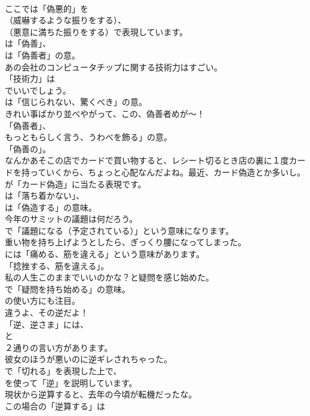 \documentclass[8pt]{extreport}
\begin{document}
\begin{CJK}{UTF8}{min}
\\	ここでは「偽悪的」を 
\\	（威嚇するような振りをする）、
\\	（悪意に満ちた振りをする）で表現しています。
\\	は「偽善」、
\\	は「偽善者」の意。	
\\	あの会社のコンピュータチップに関する技術力はすごい。 
\\	「技術力」は 
\\	でいいでしょう。
\\	は「信じられない、驚くべき」の意。	
\\	きれい事ばかり並べやがって、この、偽善者めが～！ 
\\	「偽善者」、
\\	もっともらしく言う、うわべを飾る」の意。
\\	「偽善の」。	
\\	なんかあそこの店でカードで買い物すると、レシート切るとき店の裏に１度カードを持っていくから、ちょっと心配なんだよね。最近、カード偽造とか多いし。 
\\	が「カード偽造」に当たる表現です。
\\	は「落ち着かない」、
\\	は「偽造する」の意味。	
\\	今年のサミットの議題は何だろう。 
\\	で「議題になる（予定されている）」という意味になります。	
\\	重い物を持ち上げようとしたら、ぎっくり腰になってしまった。 
\\	には「痛める、筋を違える」という意味があります。
\\	「捻挫する、筋を違える」。	
\\	私の人生このままでいいのかな？と疑問を感じ始めた。 
\\	で「疑問を持ち始める」の意味。
\\	の使い方にも注目。	
\\	違うよ、その逆だよ！ 
\\	「逆、逆さま」には、
\\	と
\\	２通りの言い方があります。	
\\	彼女のほうが悪いのに逆ギレされちゃった。 
\\	で「切れる」を表現した上で、
\\	を使って「逆」を説明しています。	
\\	現状から逆算すると、去年の今頃が転機だったな。 
\\	この場合の「逆算する」は 

\end{CJK}
\end{document}

